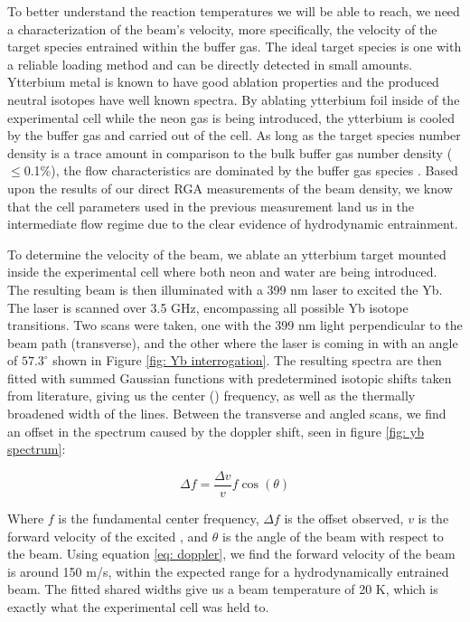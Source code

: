 To better understand the reaction temperatures we will be able to reach, we need a characterization of the beam's velocity, more specifically, the velocity of the target species entrained within the buffer gas. The ideal target species is one with a reliable loading method and can be directly detected in small amounts. Ytterbium metal is known to have good ablation properties and the produced neutral isotopes have well known spectra. By ablating ytterbium foil inside of the experimental cell while the neon gas is being introduced, the ytterbium is cooled by the buffer gas and carried out of the cell. As long as the target species number density is a trace amount in comparison to the bulk buffer gas number density ($\leq$0.1\%), the flow characteristics are dominated by the buffer gas species \cite{Hutzler2012}. Based upon the results of our direct RGA measurements of the beam density, we know that the cell parameters used in the previous measurement land us in the intermediate flow regime due to the clear evidence of hydrodynamic entrainment.

To determine the velocity of the beam, we ablate an ytterbium target mounted inside the experimental cell where both neon and water are being introduced. The resulting beam is then illuminated with a 399 nm laser to excited the Yb. The laser is scanned over 3.5 GHz, encompassing all possible Yb isotope transitions. Two scans were taken, one with the 399 nm light perpendicular to the beam path (transverse), and the other where the laser is coming in with an angle of $57.3^\circ$ shown in Figure \ref{fig: Yb interrogation}. The resulting spectra are then fitted with summed Gaussian functions with predetermined isotopic shifts taken from literature, giving us the center () frequency, as well as the thermally broadened width of the lines. Between the transverse and angled scans, we find an offset in the spectrum caused by the doppler shift, seen in figure \ref{fig: yb spectrum}:

\begin{equation}
	\Delta f = \frac{\Delta v}{v} f \cos(\theta)
	\label{eq: doppler}
\end{equation}

Where $f$ is the fundamental center frequency, $\Delta f$ is the offset observed, $v$ is the forward velocity of the excited , and $\theta$ is the angle of the beam with respect to the beam. Using equation \ref{eq: doppler}, we find the forward velocity of the beam is around 150 m/s, within the expected range for a hydrodynamically entrained beam. The fitted shared widths give us a beam temperature of 20 K, which is exactly what the experimental cell was held to.

